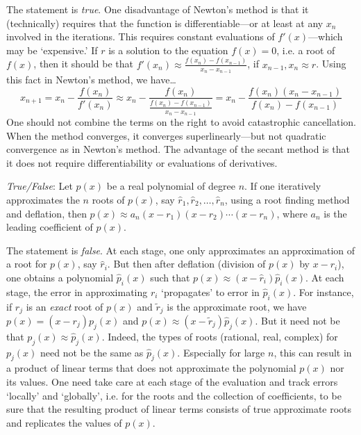 \documentclass[11pt,letterpaper]{article}
\begin{document}
\sol The statement is \textit{true}. One disadvantage of Newton's method is that it (technically) requires that the function is differentiable---or at least at any $x_n$ involved in the iterations. This requires constant evaluations of $f'(x)$---which may be `expensive.' If $r$ is a solution to the equation $f(x) = 0$, i.e. a root of $f(x)$, then it should be that $f'(x_n) \approx \frac{f(x_n) - f(x_{n-1})}{x_n - x_{n-1}}$, if $x_{n-1}, x_n \approx r$. Using this fact in Newton's method, we have\dots
	\[
	x_{n+1} = x_n - \dfrac{f(x_n)}{f'(x_n)} \approx x_n - \dfrac{f(x_n)}{\frac{f(x_n) - f(x_{n-1})}{x_n - x_{n-1}}}= x_n - \dfrac{f(x_n) (x_n - x_{n-1})}{f(x_n) - f(x_{n-1})}
	\]
One should not combine the terms on the right to avoid catastrophic cancellation. When the method converges, it converges superlinearly---but not quadratic convergence as in Newton's method. The advantage of the secant method is that it does not require differentiability or evaluations of derivatives. \pvspace{1.3cm}



\quizsol \textit{True/False}: Let $p(x)$ be a real polynomial of degree $n$. If one iteratively approximates the $n$ roots of $p(x)$, say $\widehat{r}_1, \widehat{r}_2, \ldots, \widehat{r}_n$, using a root finding method and deflation, then $p(x) \approx a_n (x - r_1) (x - r_2) \cdots (x - r_n)$, where $a_n$ is the leading coefficient of $p(x)$. \pspace

\sol The statement is \textit{false}. At each stage, one only approximates an approximation of a root for $p(x)$, say $\widehat{r}_i$. But then after deflation (division of $p(x)$ by $x - r_i$), one obtains a polynomial $\widehat{p}_i(x)$ such that $p(x) \approx (x - \widehat{r}_i) \widehat{p}_i(x)$. At each stage, the error in approximating $r_i$ `propagates' to error in $\widehat{p}_i(x)$. For instance, if $r_j$ is an \textit{exact} root of $p(x)$ and $\tilde{r}_j$ is the approximate root, we have $p(x) = (x - r_j) p_j(x)$ and $p(x) \approx (x - \tilde{r}_j) \widehat{p}_j(x)$. But it need not be that $p_j(x) \approx \widehat{p}_j(x)$. Indeed, the types of roots (rational, real, complex) for $p_j(x)$ need not be the same as $\widehat{p}_j(x)$. Especially for large $n$, this can result in a product of linear terms that does not approximate the polynomial $p(x)$ nor its values. One need take care at each stage of the evaluation and track errors `locally' and `globally', i.e. for the roots and the collection of coefficients, to be sure that the resulting product of linear terms consists of true approximate roots and replicates the values of $p(x)$. \pvspace{1.3cm}
\end{document}
